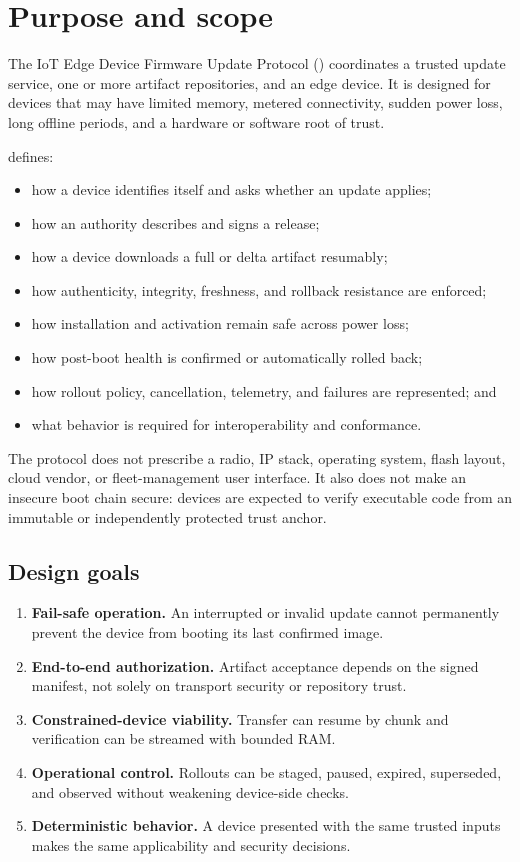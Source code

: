 \section{Purpose and scope}

The IoT Edge Device Firmware Update Protocol (\protocol) coordinates a trusted
update service, one or more artifact repositories, and an edge device. It is
designed for devices that may have limited memory, metered connectivity, sudden
power loss, long offline periods, and a hardware or software root of trust.

\protocol defines:

\begin{itemize}
  \item how a device identifies itself and asks whether an update applies;
  \item how an authority describes and signs a release;
  \item how a device downloads a full or delta artifact resumably;
  \item how authenticity, integrity, freshness, and rollback resistance are enforced;
  \item how installation and activation remain safe across power loss;
  \item how post-boot health is confirmed or automatically rolled back;
  \item how rollout policy, cancellation, telemetry, and failures are represented; and
  \item what behavior is required for interoperability and conformance.
\end{itemize}

The protocol does not prescribe a radio, IP stack, operating system, flash
layout, cloud vendor, or fleet-management user interface. It also does not make
an insecure boot chain secure: devices are expected to verify executable code
from an immutable or independently protected trust anchor.

\subsection{Design goals}

\begin{enumerate}
  \item \textbf{Fail-safe operation.} An interrupted or invalid update cannot
        permanently prevent the device from booting its last confirmed image.
  \item \textbf{End-to-end authorization.} Artifact acceptance depends on the
        signed manifest, not solely on transport security or repository trust.
  \item \textbf{Constrained-device viability.} Transfer can resume by chunk and
        verification can be streamed with bounded RAM.
  \item \textbf{Operational control.} Rollouts can be staged, paused, expired,
        superseded, and observed without weakening device-side checks.
  \item \textbf{Deterministic behavior.} A device presented with the same trusted
        inputs makes the same applicability and security decisions.
\end{enumerate}

